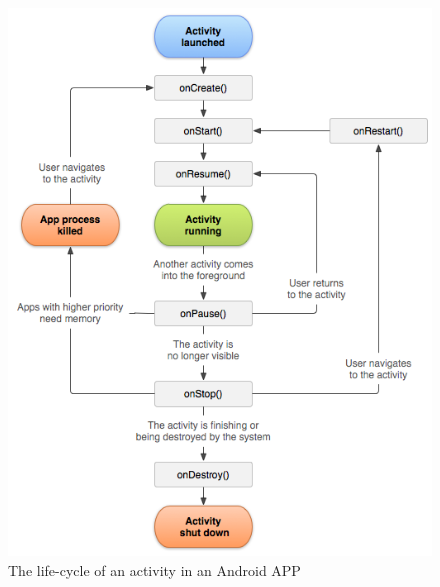 \begin{figure}[hbtp]
    \centering
    \includegraphics[scale=0.9]{images/SE_android_activities.png}
    \caption{The life-cycle of an activity in an Android APP}
    \label{fig:SE_android_activities}
\end{figure}